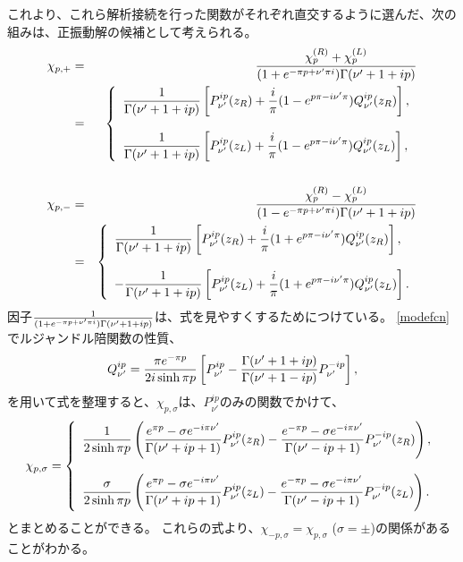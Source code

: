 これより、これら解析接続を行った関数がそれぞれ直交するように選んだ、次の組みは、正振動解の候補として考えられる。
\begin{eqnarray}
  \chi_{p,+}&=&
 {\chi_p^{(R)}+\chi_p^{(L)}
  \over(1+e^{-\pi p+\nu'\pi i})\Gamma(\nu'+1+ip)}
\nonumber\\
&=&\left\{\begin{array}{l}
\displaystyle {1\over\Gamma(\nu'+1+ip)}
 \left[P^{ip}_{\nu'}(z_R)
       +{i\over\pi}(1-e^{p\pi-i\nu'\pi})Q^{ip}_{\nu'}(z_R)\right],
\\\\
\displaystyle {1\over\Gamma(\nu'+1+ip)}
 \left[P^{ip}_{\nu'}(z_L)
       +{i\over\pi}(1-e^{p\pi-i\nu'\pi})Q^{ip}_{\nu'}(z_L)\right],
 \end{array}\right.
\nonumber\\\nonumber\\
  \chi_{p,-}&=&
 {\chi_p^{(R)}-\chi_p^{(L)}
  \over(1-e^{-\pi p+\nu'\pi i})\Gamma(\nu'+1+ip)}
\nonumber\\
&=&\left\{\begin{array}{l}
\displaystyle{1\over\Gamma(\nu'+1+ip)}
 \left[P^{ip}_{\nu'}(z_R)
       +{i\over\pi}(1+e^{p\pi-i\nu'\pi})Q^{ip}_{\nu'}(z_R)\right],
\\\\
\displaystyle -{1\over\Gamma(\nu'+1+ip)}
 \left[P^{ip}_{\nu'}(z_L)
       +{i\over\pi}(1+e^{p\pi-i\nu'\pi})Q^{ip}_{\nu'}(z_L)\right].
 \end{array}\right.
\label{modefcn}
\end{eqnarray}
因子${1}\over{(1+e^{-\pi p+\nu'\pi i})\Gamma(\nu'+1+ip)}$は、式を見やすくするためにつけている。
\ref{modefcn}でルジャンドル陪関数の性質、
\begin{equation}
Q^{ip}_{\nu'}={\pi e^{-\pi p}\over2i\sinh\pi p}\left[P^{ip}_{\nu'}
-{\Gamma(\nu'+1+ip)\over\Gamma(\nu'+1-ip)}P^{-ip}_{\nu'}\right],
\label{QtoP}
\end{equation}
を用いて式を整理すると、$\chi_{p,\sigma}$は、$P^{ip}_{\nu'}$のみの関数でかけて、
\begin{equation}
 \chi_{p,\sigma} =
 \left\{
 \begin{array}{l}
  \displaystyle
 {1\over 2\sinh\pi p}\left(
 {e^{\pi p}-\sigma e^{-i\pi\nu'}\over \Gamma(\nu'+ip +1)}
 P^{ip}_{\nu'}(z_R)-
 {e^{-\pi p}-\sigma e^{-i\pi\nu'}\over \Gamma(\nu'-ip +1)}
 P^{-ip}_{\nu'}(z_R)\right),
 \\\\
  \displaystyle
 {\sigma\over 2\sinh\pi p}\left(
 {e^{\pi p}-\sigma e^{-i\pi\nu'}\over \Gamma(\nu'+ip +1)}
 P^{ip}_{\nu'}(z_L)-
 {e^{-\pi p}-\sigma e^{-i\pi\nu'}\over \Gamma(\nu'-ip +1)}
 P^{-ip}_{\nu'}(z_L)\right).
 \end{array}
 \right.
\label{modefcn2}
\end{equation}
とまとめることができる。
これらの式より、$\chi_{-p,\sigma}=\chi_{p,\sigma}$ ($\sigma=\pm$)の関係があることがわかる。

